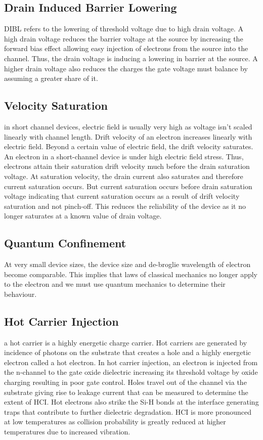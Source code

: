 \subsection{Drain Induced Barrier Lowering}
DIBL refers to the lowering of threshold voltage due to high drain voltage. A high drain voltage reduces the barrier voltage at the source by increasing the forward bias effect allowing easy injection of electrons from the source into the channel. Thus, the drain voltage is inducing a lowering in barrier at the source. A higher drain voltage also reduces the charges the gate voltage must balance by assuming a greater share of it. 
\subsection{Velocity Saturation}
in short channel devices, electric field is usually very high as voltage isn’t scaled linearly with channel length. Drift velocity of an electron increases linearly with electric field. Beyond a certain value of electric field, the drift velocity saturates. An electron in a short-channel device is under high electric field stress. Thus, electrons attain their saturation drift velocity much before the drain saturation voltage. At saturation velocity, the drain current also saturates and therefore current saturation occurs. But current saturation occurs before drain saturation voltage indicating that current saturation occurs as a result of drift velocity saturation and not pinch-off. This reduces the reliability of the device as it no longer saturates at a known value of drain voltage.
\subsection{Quantum Confinement}
At very small device sizes, the device size and de-broglie wavelength of electron become comparable. This implies that laws of classical mechanics no longer apply to the electron and we must use quantum mechanics to determine their behaviour.
\subsection{Hot Carrier Injection}
a hot carrier is a highly energetic charge carrier. Hot carriers are generated by incidence of photons on the substrate that creates a hole and a highly energetic electron called a hot electron. In hot carrier injection, an electron is injected from the n-channel to the gate oxide dielectric increasing its threshold voltage by oxide charging resulting in poor gate control. Holes travel out of the channel via the substrate giving rise to leakage current that can be measured to determine the extent of HCI. Hot electrons also strike the Si-H bonds at the interface generating traps that contribute to further dielectric degradation. HCI is more pronounced at low temperatures as collision probability is greatly reduced at higher temperatures due to increased vibration.
